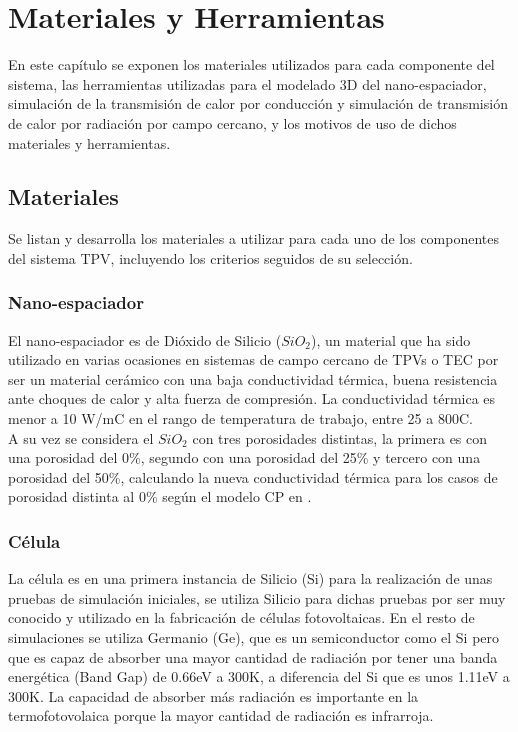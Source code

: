 \chapter{Materiales y Herramientas}
En este capítulo se exponen los materiales utilizados para cada componente del sistema, las herramientas utilizadas para el modelado 3D del nano-espaciador, simulación de la transmisión de calor por conducción y simulación de transmisión de calor por radiación por campo cercano, y los motivos de uso de dichos materiales y herramientas.
\section{Materiales}
Se listan y desarrolla los materiales a utilizar para cada uno de los componentes del sistema TPV, incluyendo los criterios seguidos de su selección.
\subsection{Nano-espaciador}
El nano-espaciador es de Dióxido de Silicio ($SiO_2$), un material que ha sido utilizado en varias ocasiones en sistemas de campo cercano de TPVs o TEC por ser un material cerámico con una baja conductividad térmica, buena resistencia ante choques de calor y alta fuerza de compresión. La conductividad térmica es menor a 10 W/m\textdegree C en el rango de temperatura de trabajo, entre 25 a 800\textdegree C.\\

A su vez se considera el $SiO_2$ con tres porosidades distintas, la primera es con una porosidad del 0\%, segundo con una porosidad del 25\% y tercero con una porosidad del 50\%, calculando la nueva conductividad térmica para los casos de porosidad distinta al 0\% según el modelo CP en \cite{ThermalConductivity_SiO2_2018}.

\subsection{Célula}
La célula es en una primera instancia de Silicio (Si) para la realización de unas pruebas de simulación iniciales, se utiliza Silicio para dichas pruebas por ser muy conocido y utilizado en la fabricación de células fotovoltaicas. En el resto de simulaciones se utiliza Germanio (Ge), que es un semiconductor como el Si pero que es capaz de absorber una mayor cantidad de radiación por tener una banda energética (Band Gap) de 0.66eV a 300K, a diferencia del Si que es unos 1.11eV a 300K. La capacidad de absorber más radiación es importante en la termofotovolaica porque la mayor cantidad de radiación es infrarroja.\\

